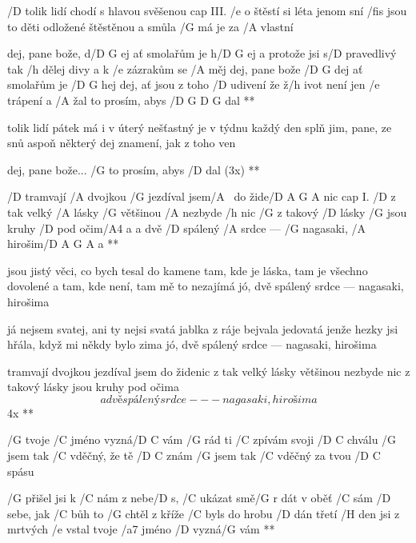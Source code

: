 
/D tolik lidí chodí s hlavou svěšenou \hfill cap III.
/e o štěstí si léta jenom sní
/fis jsou to děti odložené štěstěnou
a smůla /G má je za /A vlastní

\R  dej, pane bože, d/{D G} ej
    ať smolařům je h/{D G} ej
    a protože jsi s/D pravedlivý
    tak /h dělej divy
    a k /e zázrakům se /A měj
    dej, pane bože /{D G} dej
    ať smolařům je /{D G} hej
    dej, ať jsou z toho /D udivení
    že ž/h ivot není jen /e trápení a /A žal
    to prosím, abys /{D G D G} dal **

tolik lidí pátek má i v úterý
nešťastný je v týdnu každý den
splň jim, pane, ze snů aspoň některý
dej znamení, jak z toho ven

\R  dej, pane bože...
    /G to prosím, abys /D dal (3x) **




\R  /D tramvají /A dvojkou /G jezdíval jsem/A ~do žide/{D A G A} nic \hfill cap I.
    /D z tak velký /A lásky /G většinou /A nezbyde /h nic
    /G z takový /D lásky /G jsou kruhy /D pod očim/A4 a
    a dvě /D spálený /A srdce --- /G nagasaki, /A hirošim/{D A G A} a **

jsou jistý věci, co bych tesal do kamene
tam, kde je láska, tam je všechno dovolené
a tam, kde není, tam mě to nezajímá
jó, dvě spálený srdce --- nagasaki, hirošima \s

já nejsem svatej, ani ty nejsi svatá
jablka z ráje bejvala jedovatá
jenže hezky jsi hřála, když mi někdy bylo zima
jó, dvě spálený srdce --- nagasaki, hirošima

\R  tramvají dvojkou jezdíval jsem do židenic
    z tak velký lásky většinou nezbyde nic
    z takový lásky jsou kruhy pod očima
    \[ a dvě spálený srdce --- nagasaki, hirošima \] 4x **




/G tvoje /C jméno vyzná/{D C} vám
/G rád ti /C zpívám svoji /{D C} chválu
/G jsem tak /C vděčný, že tě /{D C} znám
/G jsem tak /C vděčný za tvou /{D C} spásu

\R  /G přišel jsi k /C nám z nebe/D s, /C ukázat smě/G r
    dát v oběť /C sám /D sebe, jak /C bůh to /G chtěl
    z kříže /C byls do hrobu /D dán
    třetí /H den jsi z mrtvých /e vstal
    tvoje /a7 jméno /D vyzná/G vám **



